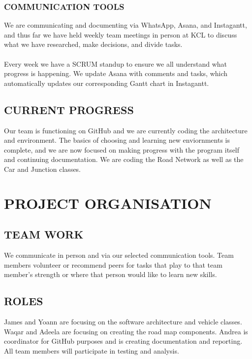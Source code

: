 \documentclass[11pt]{article}
\begin{document}
\subsubsection*{COMMUNICATION TOOLS}

We are communicating and documenting via WhatsApp, Asana, and Instagantt, and thus far we have held weekly team meetings in person at KCL to discuss what we have researched, make decisions, and divide tasks.
\\ \\
Every week we have a SCRUM standup to ensure we all understand what progress is happening. We update Asana with comments and tasks, which automatically updates our corresponding Gantt chart in Instagantt.


\subsection{CURRENT PROGRESS}

Our team is functioning on GitHub and we are currently coding the architecture and environment. The basics of choosing and learning new enviornments is complete, and we are now focused on making progress with the program itself and continuing documentation. 
We are coding the Road Network as well as the Car and Junction classes.



\section{PROJECT ORGANISATION}

\subsection{TEAM WORK}

We communicate in person and via our selected communication tools.  Team members 
volunteer or recommend peers for tasks that play to that team member's strength or where 
that person would like to learn new skills.


\subsection{ROLES}

James and Yoann are focusing on the software architecture and vehicle classes. Waqar and 
Adeela are focusing on creating the road map components. Andrea is coordinator for GitHub 
purposes and is creating documentation and reporting. All team members will participate 
in testing and analysis.
\end{document}
